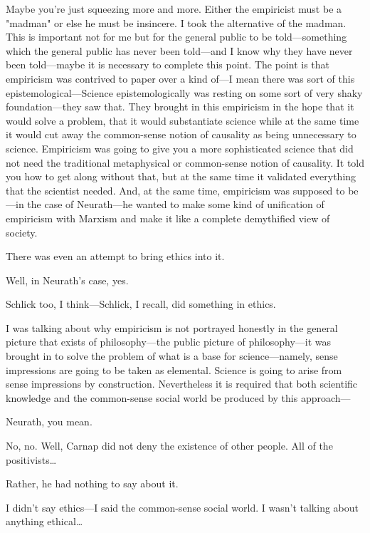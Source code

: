 Maybe you're just squeezing more and more. Either the empiricist 
must be a "madman" or else he must be insincere. I took the alternative 
of the madman. This is important not for me but for the general public 
to be told---something which the general public has never been 
told---and I know why they have never been told---maybe it is necessary to 
complete this point. The point is that empiricism was contrived to 
paper over a kind of---I mean there was sort of this 
epistemological---Science epistemologically was resting on some sort of very shaky 
foundation---they saw that. They brought in this empiricism in the 
hope that it would solve a problem, that it would substantiate science 
while at the same time it would cut away the common-sense notion of 
causality as being unnecessary to science. Empiricism was going to give 
you a more sophisticated science that did not need the traditional 
metaphysical or common-sense notion of causality. It told you how to 
get along without that, but at the same time it validated everything that 
the scientist needed. And, at the same time, empiricism was supposed to 
be---in the case of Neurath---he wanted to make some kind of unification 
of empiricism with Marxism and make it like a complete demythified view of society. 

 There was even an attempt to bring ethics into it. 

 Well, in Neurath's case, yes. 

 Schlick too, I think---Schlick, I recall, did something in 
ethics.

 I was talking about why empiricism is not portrayed honestly 
in the general picture that exists of philosophy---the public picture of 
philosophy---it was brought in to solve the problem of what is a base 
for science---namely, sense impressions are going to be taken as 
elemental. Science is going to arise from sense impressions by construction. 
Nevertheless it is required that both scientific knowledge and the 
common-sense social world be produced by this approach--- 

 Neurath, you mean. 

 No, no. Well, Carnap did not deny the existence of other 
people. All of the positivists\ldots

 Rather, he had nothing to say about it. 

 I didn't say ethics---I said the common-sense social world. I 
wasn't talking about anything ethical\ldots


